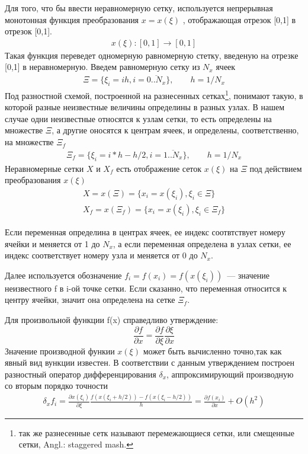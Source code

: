 Для того, что бы ввести неравномерную сетку, используется непрерывная монотонная функция преобразования $ x = x(\xi) $  , отображающая отрезок [0,1] в отрезок [0,1]. 
\begin{gather}
  x(\xi): [0,1] \longrightarrow [0,1]
\end{gather}
Такая функция переведет одномерную равномерную стетку, введеную на отрезке [0,1] в неравномерную. Введем равномерную сетку из $N_x$ ячеек 
\begin{gather}
 \Xi = \{\xi_i = ih, i = \overline{0..N_x}\}, \qquad h = 1 / N_x 
\end{gather}
Под разностной схемой, построенной на разнесенных сетках\footnote{так же разнесенные сетк называют перемежающиеся сетки, или смещенные сетки, Angl.: staggered mash.}, понимают такую, в которой разные неизвестные величины определины в разных узлах. В нашем случае одни неизвестные относятся к узлам сетки, то есть определены на множестве $\Xi$, а другие оносятся к центрам ячеек, и определены, соответственно, на множестве $\Xi_f$
\begin{gather}
 \Xi_f = \{ \xi_i = i*h - h/2, i = \overline{1..N_x} \}, \qquad h = 1/N_x
\end{gather}
Неравномерные сетки $X$ и $X_f$ есть отображение сеток $x(\xi)$ на $\Xi$ под действием преобразования $x(\xi)$
\begin{gather}
 X = x(\Xi) = \{x_i = x(\xi_i), \xi_i \in \Xi\} \\
 X_f = x(\Xi_f) = \{ x_i = x(\xi_i), \xi_i \in \Xi_f \}
\end{gather}

Если переменная определина в центрах ячеек, ее индекс соотвтствует номеру ячейки и меняется от 1 до $N_x$, а если переменная определена в узлах сетки, ее индекс соответствует номеру узла и меняется от 0 до $N_x$.

Далее используется обозначение $f_i = f(x_i) = f(x(\xi_i))$~--- значение неизвестного f в i-ой точке сетки. Если сказанно, что переменная относится к центру ячейки, значит она определена на сетке $\Xi_f$.  

Для произвольной функции f(x) справедливо утверждение:
$$
  \frac{\partial f}{\partial x} = \frac{\partial f}{\partial \xi} \frac{\partial \xi}{\partial x}
$$
Значение производной функии $x(\xi)$ может быть вычисленно точно,так как явный вид вункции известен.
В соответствии с данным утверждением построен разностный оператор дифференцирования $\delta_x$, аппроксимирующий производную со вторым порядко точности
\begin{gather}
 \delta_x f_i = \frac{\partial x(\xi_i)}{\partial \xi} \frac{f(x(\xi_i + h/2)) - f(x(\xi_i - h/2))}{h}  = \frac{\partial f(x_i)}{\partial x} + O(h^2)
\end{gather}

